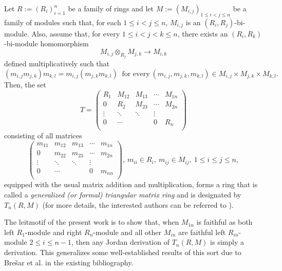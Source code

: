 \documentclass[12pt, reqno]{amsart}
\theoremstyle{definition}
\numberwithin{equation}{section}
\begin{document}
Let $R:= (R_i)_{i=1}^n$ be a family of rings and let $M:=(M_{i,j} )_{1\leq i<j\leq n}$ be a family of modules such that, for each $1\leq i<j\leq n$, $M_{i,j}$ is an $(R_i, R_j )$-bi-module. Also, assume that, for every $1\leq i<j< k \leq n$, there exists an $(R_i, R_k)$-bi-module homomorphism
$$M_{i,j}\otimes _{R_j} M_{j,k} \longrightarrow M_{i,k}$$
defined multiplicatively such that $$(m_{i,j} m_{j,k})m_{k,l} = m_{i,j} (m_{j,k}m_{k,l})\ \text{ for every}\ (m_{i,j} , m_{j,k}, m_{k,l})\in
M_{i,j} \times M_{j,k} \times M_{k,l}.$$ Then, the set $$T=\left(
                               \begin{array}{ccccc}
                                 R_1 &M_{12}&M_{13}&\cdots& M_{1n} \\
                                 0 & R_2&M_{23}&\cdots&M_{2n} \\
                                   \vdots &\ddots&\ddots&\vdots  \\
                                     0 &\cdots &&0&R_n \\
                               \end{array}
                             \right)$$ consisting of all matrices $$\left(
                               \begin{array}{ccccc}
                                m_{11}&m_{12}&m_{13}&\cdots& m_{1n} \\
                                 0 & m_{22}&m_{23}&\cdots&m_{2n} \\
                                   \vdots &\ddots&\ddots&\vdots  \\
                                     0 &\cdots &&0&m_{nn} \\
                               \end{array}
                             \right),\ m_{ii}\in R_i,\ m_{ij}\in M_{ij},\ 1\leq i\leq j\leq n,$$ equipped with the usual matrix addition and multiplication, forms a ring that is called a {\it generalized (or formal)
triangular matrix ring} and is designated by $T_n(R, M )$ (for more details, the interested authors can be referred to \cite{birk}).

The leitmotif of the present work is to show that, when $M_{1n}$ is faithful as both left $R_1$-module and right $R_n$-module and all other $M_{in}$ are faithful left $R_{in}$-module $2\leq i\leq n-1$, then any Jordan derivation of $T_n(R,M)$ is simply a derivation. This generalizes some well-established results of this sort due to Bre\v{s}ar et al. in the existing bibliography.
\end{document}
